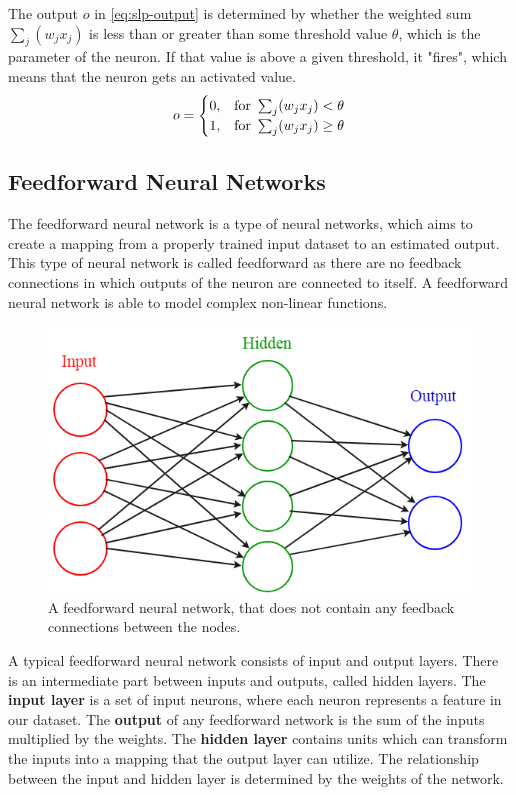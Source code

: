 The output $o$ in \eqref{eq:slp-output} is determined by whether the weighted sum $\sum_j(w_j x_j)$ is less than or greater than some threshold value $\theta$, which is the parameter of the neuron. If that value is above a given threshold, it "fires", which means that the neuron gets an activated value. 
\begin{equation} o = \begin{cases} 0, & \hbox{for}~ \sum_j(w_j x_j) < \theta \\ 1, & \hbox{for}~ \sum_j(w_j x_j) \geq \theta \end{cases} \label{eq:slp-output} \end{equation} 

\newpage

\subsection{Feedforward Neural Networks}

The feedforward neural network \cite{fine2006feedforward} is a type of neural networks, which aims to create a mapping from a properly trained input dataset to an estimated output. This type of neural network is called feedforward as there are no feedback connections in which outputs of the neuron are connected to itself. A feedforward neural network is able to model complex non-linear functions. 

\begin{figure}[h]
	\centering
	\includegraphics[height=0.35\linewidth]{./figures/feedforward}
	\caption{A feedforward neural network, that does not contain any feedback connections between the nodes.}
	\label{fig:feedforward}
\end{figure}

A typical feedforward neural network consists of input and output layers. There is an intermediate part between inputs and outputs, called hidden layers. The \textbf{input layer} is a set of input neurons, where each neuron represents a feature in our dataset. The \textbf{output} of any feedforward network is the sum of the inputs multiplied by the weights. The \textbf{hidden layer} contains units which can transform the inputs into a mapping that the output layer can utilize. The relationship between the input and hidden layer is determined by the weights of the network. \bigskip


